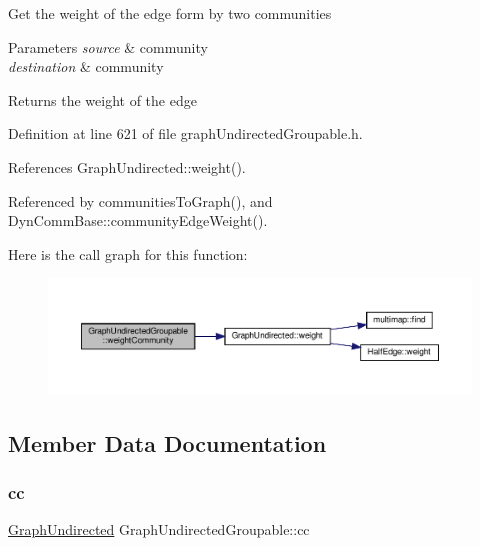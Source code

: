 Get the weight of the edge form by two communities


\begin{DoxyParams}{Parameters}
{\em source} & community \\
\hline
{\em destination} & community \\
\hline
\end{DoxyParams}
\begin{DoxyReturn}{Returns}
the weight of the edge 
\end{DoxyReturn}


Definition at line 621 of file graph\+Undirected\+Groupable.\+h.



References Graph\+Undirected\+::weight().



Referenced by communities\+To\+Graph(), and Dyn\+Comm\+Base\+::community\+Edge\+Weight().

Here is the call graph for this function\+:
\nopagebreak
\begin{figure}[H]
\begin{center}
\leavevmode
\includegraphics[width=350pt]{classGraphUndirectedGroupable_a2884361f00176ac8f16afca6feb3e404_cgraph}
\end{center}
\end{figure}


\subsection{Member Data Documentation}
\mbox{\label{classGraphUndirectedGroupable_aa76c119ec662942ae958b0463764a919}} 
\subsubsection{\texorpdfstring{cc}{cc}}
{\footnotesize\ttfamily \hyperlink{classGraphUndirected}{Graph\+Undirected} Graph\+Undirected\+Groupable\+::cc\hspace{0.3cm}{\ttfamily [private]}}



